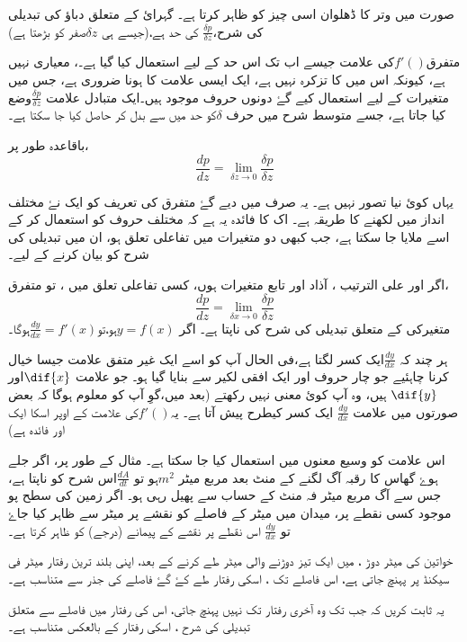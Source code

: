 صورت   میں وتر کا ڈھلوان اسی چیز کو ظاہر کرتا ہے۔ گہرائ کے متعلق دباؤ کی تبدیلی کی شرح،\( \frac{\delta p}{\delta z} \) کی حد ہے،(جیسے ہی \( \delta z   \)صفر کو بڑھتا ہے)

متفرق\( f'()\)کی علامت جیسے اب تک اس حد کے لیے استعمال کیا گیا ہے۔، معیاری نہیں ہے، کیونکہ اس میں   کا تزکرہ نہیں ہے، ایک ایسی علامت کا ہونا ضروری ہے، جس میں متغیرات کے لیے استعمال کیے گۓ دونوں حروف موجود ہیں۔ایک متبادل علامت  \( \frac{\delta p}{\delta z} \)وضع کیا جاتا ہے، جسے متوسط شرح میں حرف  \( \delta\)کو حد میں   سے بدل کر حاصل کیا جا سکتا ہے۔

باقاعدہ طور پر،\[ \frac{dp}{dz}=\lim_{\delta z \to 0}\frac{\delta p}{\delta z} \]

یہاں کوئ نیا تصور نہیں ہے۔ یہ صرف   میں دیے گۓ متفرق کی تعریف کو ایک نۓ مختلف انداز میں لکھنے کا طریقہ ہے۔ اک کا فائدہ یہ ہے کہ مختلف حروف کو استعمال کر کے اسے ملایا جا سکتا ہے، جب کبھی دو متغیرات میں تفاعلی تعلق ہو، ان میں تبدیلی کی شرح کو بیان کرنے کے لیے۔

اگر  اور  علی الترتیب ، آذاد اور تابع متغیرات ہوں، کسی تفاعلی تعلق میں ، تو متفرق،
\[\frac{dp}{dz}=\lim_{\delta x \to 0}\frac{\delta p}{\delta z}   \]
متغیرکی کے متعلق تبدیلی کی شرح کی ناپتا ہے۔ اگر \( y=f(x)\)ہو،تو\(\frac{dy}{dx}=f'(x) \)ہوگا۔

ہر چند کہ \(\frac{dy}{dx}\)ایک کسر لگتا ہے،فی الحال آپ کو اسے ایک غیر متفق علامت جیسا خیال کرنا چاہئیے جو چار حروف اور ایک افقی لکیر سے بنایا گیا ہو۔
جو علامت \( \dif{x}\)اور  \( \dif{y}\) ہیں، وہ آپ کوئ معنی نہیں رکھتے (بعد میں،گوِ آپ کو معلوم ہوگا کہ بعض صورتوں میں علامت \(\frac{dy}{dx}\) ایک کسر کیطرح پیش آتا ہے۔ یہ\(f'() \)کی علامت کے اوپر اسکا ایک اور فائدہ ہے)

اس علامت کو وسیع معنوں میں استعمال کیا جا سکتا ہے۔ مثال کے طور پر، اگر جلے ہوۓ گھاس کا رقبہ آگ لگنے کے   منٹ بعد   مربع میٹر \(   m^{2}  \)ہو تو    \( \frac{dA}{dt} \)اس شرح کو ناپتا ہے، جس سے آگ مربع میٹر فہ منٹ کے حساب سے پھیل رہی ہو۔ اگر زمین کی سطح پو موجود کسی نقطے پر، میدان میں      میٹر کے فاصلے کو نقشے پر  میٹر سے ظاہر کیا جاۓ تو   \(\frac{dy}{dx}\)  اس نقطے پر نقشے کے پیمانے (درجے) کو ظاہر کرتا ہے۔ 

خواتین کی   میٹر دوڑ ، میں ایک تیز دوڑنے والی       میٹر طے کرنے کے بعد، اپنی بلند ترین رفتار     میٹر فی سیکنڈ پر پہنچ جاتی ہے، اس فاصلے تک ، اسکی رفتار طے کۓ گۓ فاصلے کی جذر سے متناسب ہے۔

یہ ثابت کریں کہ جب تک وہ آخری رفتار تک نہیں پہنچ جاتی، اس کی رفتار میں فاصلے سے متعلق تبدیلی کی شرح ، اسکی رفتار کے بالعکس متناسب ہے۔

